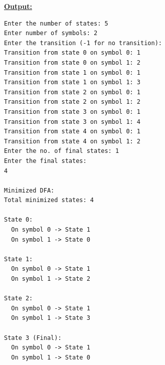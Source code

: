 \documentclass[11pt,a4paper]{article}
\begin{document}
\clearpage
\noindent\textbf{\underline{Output:}}\par\vspace{0.4em}
\begin{lstlisting}
Enter the number of states: 5
Enter number of symbols: 2
Enter the transition (-1 for no transition):
Transition from state 0 on symbol 0: 1
Transition from state 0 on symbol 1: 2
Transition from state 1 on symbol 0: 1
Transition from state 1 on symbol 1: 3
Transition from state 2 on symbol 0: 1
Transition from state 2 on symbol 1: 2
Transition from state 3 on symbol 0: 1
Transition from state 3 on symbol 1: 4
Transition from state 4 on symbol 0: 1
Transition from state 4 on symbol 1: 2
Enter the no. of final states: 1
Enter the final states:
4

Minimized DFA:
Total minimized states: 4

State 0:
  On symbol 0 -> State 1
  On symbol 1 -> State 0

State 1:
  On symbol 0 -> State 1
  On symbol 1 -> State 2

State 2:
  On symbol 0 -> State 1
  On symbol 1 -> State 3

State 3 (Final):
  On symbol 0 -> State 1
  On symbol 1 -> State 0
\end{lstlisting}
\end{document}
